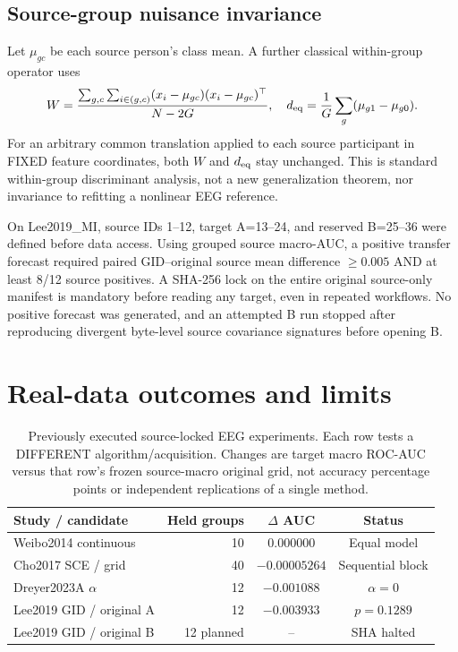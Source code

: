 \documentclass[11pt,a4paper]{article}
\begin{document}
\subsection{Source-group nuisance invariance}
Let $\mu_{gc}$ be each source person's class mean.
A further classical within-group operator uses
\[
 W={\sum_{g,c}\sum_{i\in(g,c)}
 (x_i-\mu_{gc})(x_i-\mu_{gc})^\top\over N-2G},
 \quad
 d_{\rm eq}={1\over G}\sum_g(\mu_{g1}-\mu_{g0}).
\]
For an arbitrary common translation applied to
each source participant in FIXED feature coordinates,
both $W$ and $d_{\rm eq}$ stay unchanged. This is
standard within-group discriminant analysis,
not a new generalization theorem, nor invariance
to refitting a nonlinear EEG reference.

On Lee2019\_MI, source IDs 1--12,
target A=13--24, and reserved B=25--36
were defined before data access. Using grouped
source macro-AUC, a positive transfer forecast
required paired GID--original source mean difference
$\geq 0.005$ AND at least 8/12 source positives.
A SHA-256 lock on the entire original source-only
manifest is mandatory before reading any target,
even in repeated workflows. No positive forecast
was generated, and an attempted B run stopped
after reproducing divergent byte-level source
covariance signatures before opening B.

\section{Real-data outcomes and limits}
\begin{table}[ht]
\centering\small
\caption{Previously executed source-locked
EEG experiments. Each row tests a DIFFERENT
algorithm/acquisition. Changes are target
macro ROC-AUC versus that row's frozen
source-macro original grid, not accuracy
percentage points or independent
replications of a single method.}
\begin{tabular}{p{.25\linewidth}rcc}
\toprule
Study / candidate & Held groups & $\Delta$ AUC & Status\\
\midrule
Weibo2014 continuous & 10 & $0.000000$ & Equal model\\
Cho2017 SCE / grid & 40 & $-0.00005264$ & Sequential block\\
Dreyer2023A $\alpha$ & 12 & $-0.001088$ & $\alpha=0$\\
Lee2019 GID / original A & 12 & $-0.003933$ & $p=0.1289$\\
Lee2019 GID / original B & 12 planned & -- & SHA halted\\
\bottomrule
\end{tabular}
\end{table}
\end{document}
